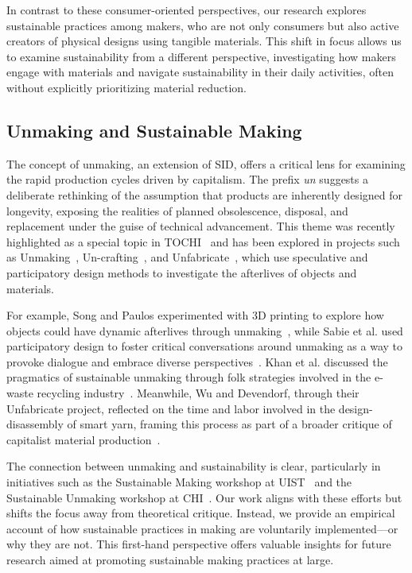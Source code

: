 In contrast to these consumer-oriented perspectives, our research explores sustainable practices among makers, who are not only consumers but also active creators of physical designs using tangible materials. This shift in focus allows us to examine sustainability from a different perspective, investigating how makers engage with materials and navigate sustainability in their daily activities, often without explicitly prioritizing material reduction.

\subsection{Unmaking and Sustainable Making}

The concept of unmaking, an extension of SID, offers a critical lens for examining the rapid production cycles driven by capitalism. 
The prefix \textit{un} suggests a deliberate rethinking of the assumption that products are inherently designed for longevity, exposing the realities of planned obsolescence, disposal, and replacement under the guise of technical advancement. 
This theme was recently highlighted as a special topic in TOCHI~\cite{song2025unmaking} and has been explored in projects such as Unmaking~\cite{Unmaking}, Un-crafting~\cite{murer2015crafting}, and Unfabricate~\cite{10.1145/3313831.3376227}, which use speculative and participatory design methods to investigate the afterlives of objects and materials.


For example, Song and Paulos experimented with 3D printing to explore how objects could have dynamic afterlives through unmaking~\cite{Unmaking}, while Sabie et al. used participatory design to foster critical conversations around unmaking as a way to provoke dialogue and embrace diverse perspectives~\cite{sabie2022unmaking}. 
Khan et al. discussed the pragmatics of sustainable unmaking through folk strategies involved in the e-waste recycling industry~\cite{khan2023pragmatics}. Meanwhile, Wu and Devendorf, through their Unfabricate project, reflected on the time and labor involved in the design-disassembly of smart yarn, framing this process as part of a broader critique of capitalist material production~\cite{10.1145/3313831.3376227}.

The connection between unmaking and sustainability is clear, particularly in initiatives such as the Sustainable Making workshop at UIST~\cite{yan2023future} and the Sustainable Unmaking workshop at CHI~\cite{song2024sustainable}. 
Our work aligns with these efforts but shifts the focus away from theoretical critique. 
Instead, we provide an empirical account of how sustainable practices in making are voluntarily implemented—or why they are not. 
This first-hand perspective offers valuable insights for future research aimed at promoting sustainable making practices at large.

